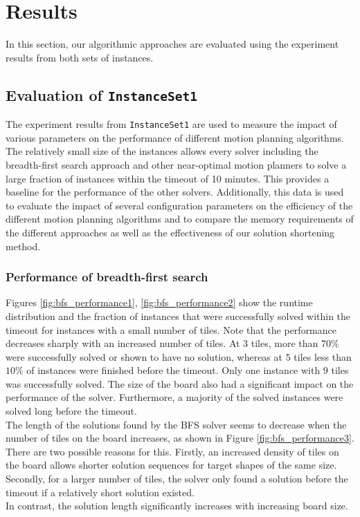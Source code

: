 \section{Results}

In this section, our algorithmic approaches are evaluated using the experiment results from both sets of instances.

\subsection{Evaluation of \texttt{InstanceSet1}}

The experiment results from \texttt{InstanceSet1} are used to measure the impact of various parameters on the performance of different motion planning algorithms. The relatively small size of the instances allows every solver including the breadth-first search approach and other near-optimal motion planners to solve a large fraction of instances within the timeout of 10 minutes. This provides a baseline for the performance of the other solvers. Additionally, this data is used to evaluate the impact of several configuration parameters on the efficiency of the different motion planning algorithms and to compare the memory requirements of the different approaches as well as the effectiveness of our solution shortening method.

\subsubsection {Performance of breadth-first search}

Figures \ref{fig:bfs_performance1}, \ref{fig:bfs_performance2} show the runtime distribution and the fraction of instances that were successfully solved within the timeout
for instances with a small number of tiles. Note that the performance decreases sharply with an
increased number of tiles. At 3 tiles, more than $70\%$ were successfully solved or shown to have no solution, whereas at 5 tiles less than $10\%$ of instances were finished before the timeout. Only one instance with 9 tiles was successfully solved. The size of the board also had a significant impact on the performance of the solver. Furthermore, a majority of the solved instances were solved long before the timeout. \\
The length of the solutions found by the BFS solver seems to decrease when the number of tiles on the board increases, as shown in Figure \ref{fig:bfs_performance3}. There are two possible reasons for this. Firstly, an increased density of tiles on the board allows shorter solution sequences for target shapes of the same size. Secondly, for a larger number of tiles, the solver only found a solution before the timeout if a relatively short solution existed. \\
In contrast, the solution length significantly increases with increasing board size.
\newpage

